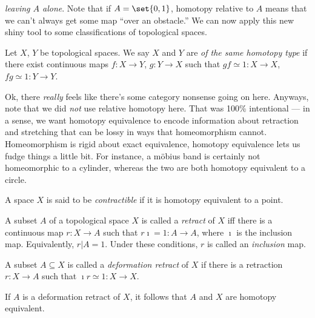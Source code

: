 \documentclass{fkbook}
\begin{document}
\begin{adjustwidth}{1em}{1em}
  \emph{leaving $A$ alone}. Note that if $A = \set{0,1}$, homotopy
  relative to $A$ means that we can't always get some map ``over an
  obstacle.'' We can now apply this new shiny tool to some
  classifications of topological spaces.
  \begin{definition}
    Let $X$, $Y$ be topological spaces. We say $X$ and $Y$ are
    \emph{of the same homotopy type} if there exist continuous maps $f
    : X \to Y$, $g : Y \to X$ such that $gf \simeq 1 : X \to X$, $fg
    \simeq 1 : Y \to Y$.
  \end{definition}
  Ok, there \emph{really} feels like there's some category nonsense
  going on here. Anyways, note that we did \emph{not} use relative
  homotopy here. That was 100\% intentional --- in a sense, we want
  homotopy equivalence to encode information about retraction and
  stretching that can be lossy in ways that homeomorphism cannot.
  Homeomorphism is rigid about exact equivalence, homotopy equivalence
  lets us fudge things a little bit. For instance, a m\"{o}bius band
  is certainly not homeomorphic to a cylinder, whereas the two are
  both homotopy equivalent to a circle.
  \begin{definition}
    A space $X$ is said to be \emph{contractible} if it is homotopy
    equivalent to a point.
  \end{definition}
  \begin{definition}
    A subset $A$ of a topological space $X$ is called a \emph{retract}
    of $X$ iff there is a continuous map $r : X \to A$ such that
    $r\imath = 1 : A \to A$, where $\imath$ is the inclusion map.
    Equivalently, $r | A = 1$. Under these conditions, $r$ is called
    an \emph{inclusion} map.
  \end{definition}
  \begin{definition}
    A subset $A \subseteq X$ is called a \emph{deformation retract} of
    $X$ if there is a retraction $r : X \to A$ such that $\imath r
    \simeq 1 : X \to X$.
  \end{definition}
  If $A$ is a deformation retract of $X$, it follows that $A$ and $X$
  are homotopy equivalent.
\end{adjustwidth}
\end{document}
